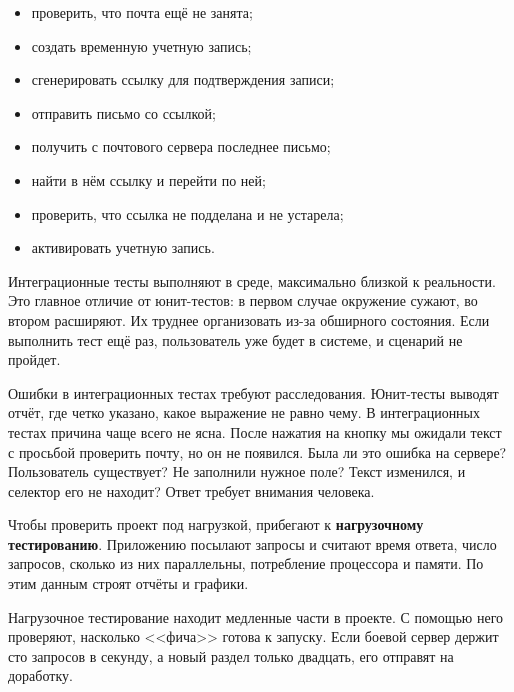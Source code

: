 \begin{itemize}

\item
  проверить, что почта ещё не занята;

\item
  создать временную учетную запись;

\item
  сгенерировать ссылку для подтверждения записи;

\item
  отправить письмо со ссылкой;

\item
  получить с почтового сервера последнее письмо;

\item
  найти в нём ссылку и перейти по ней;

\item
  проверить, что ссылка не подделана и не устарела;

\item
  активировать учетную запись.

\end{itemize}

Интеграционные тесты выполняют в среде, максимально близкой к реальности. Это
главное отличие от юнит-тестов: в первом случае окружение сужают, во втором
расширяют. Их труднее организовать из-за обширного состояния. Если выполнить
тест ещё раз, пользователь уже будет в системе, и сценарий не пройдет.

Ошибки в интеграционных тестах требуют расследования. Юнит-тесты выводят отчёт,
где четко указано, какое выражение не равно чему. В интеграционных тестах
причина чаще всего не ясна. После нажатия на кнопку мы ожидали текст с просьбой
проверить почту, но он не появился. Была ли это ошибка на сервере? Пользователь
существует? Не заполнили нужное поле? Текст изменился, и селектор его не
находит? Ответ требует внимания человека.


Чтобы проверить проект под нагрузкой, прибегают к \textbf{нагрузочному тестированию}.
Приложению посылают запросы и считают время ответа, число запросов, сколько
из них параллельны, потребление процессора и памяти. По этим данным строят
отчёты и графики.


Нагрузочное тестирование находит медленные части в проекте. С помощью него
проверяют, насколько <<фича>> готова к запуску. Если боевой сервер держит сто
запросов в секунду, а новый раздел только двадцать, его отправят на доработку.

